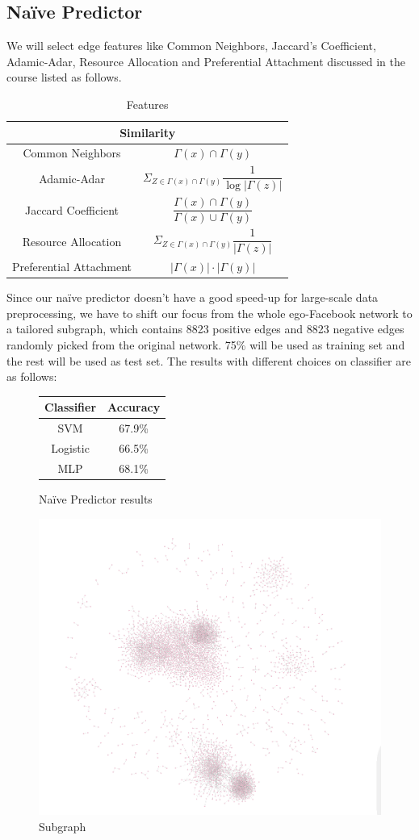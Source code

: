 \documentclass[11pt]{article}
\begin{document}
\subsection{Naïve Predictor}
We will select edge features like Common Neighbors, Jaccard's Coefficient, Adamic-Adar, Resource Allocation and Preferential Attachment discussed in the course listed as follows.

\begin{table}[H]
	\centering
	\begin{tabular}{cc}
		\hline\multicolumn{2}{c}{Similarity}                                                           \\\hline
		Common Neighbors        & $\Gamma(x)\cap\Gamma(y)$                                             \\
		Adamic-Adar             & $\Sigma_{Z\in \Gamma(x)\cap\Gamma(y)}\dfrac{1}{\log{| \Gamma(z) |}}$ \\
		Jaccard Coefficient     & $\dfrac{\Gamma(x)\cap\Gamma(y)}{\Gamma(x)\cup\Gamma(y)}$             \\
		Resource Allocation     & $\Sigma_{Z\in \Gamma(x)\cap\Gamma(y)}\dfrac{1}{| \Gamma(z) |}$       \\
		Preferential Attachment & $|\Gamma(x)| \cdot |\Gamma(y)|$
	\end{tabular}
	\caption{Features}
\end{table}

Since our naïve predictor doesn't have a good speed-up for large-scale data preprocessing, we have to shift our focus from the whole ego-Facebook network to a tailored subgraph, which contains 8823 positive edges and 8823 negative edges randomly picked from the original network. 75\% will be used as training set and the rest will be used as test set. The results with different choices on classifier are as follows:
\begin{figure}[H]
	\centering
	\parbox{.45\linewidth}{
		\centering
		\begin{tabular}{cc}
			\hline Classifier & Accuracy \\\hline
			SVM               & 67.9\%   \\
			Logistic          & 66.5\%   \\
			MLP               & 68.1\%
		\end{tabular}
	\caption{Naïve Predictor results}
	}
	\parbox{.45\linewidth}{
			\centering
		\includegraphics[width=.3\linewidth]{graphs/subgraph.PNG}
		\caption{Subgraph}
	}
\end{figure}
\end{document}
